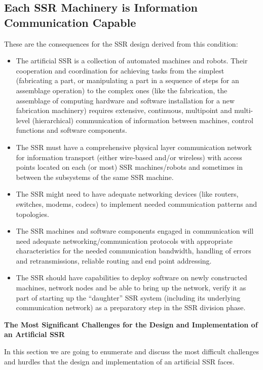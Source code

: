 \documentclass[letterpaper]{article}
\begin{document}
\subsection[Each SSR Machinery is Information Communication
Capable]{Each SSR Machinery is Information Communication Capable}
\hypertarget{RefHeading3134306210128}{}These are the consequences for
the SSR design derived from this condition:


\bigskip

\begin{itemize}
\item The artificial SSR is a collection of automated machines and
robots. Their cooperation and coordination for achieving tasks from the
simplest (fabricating a part, or manipulating a part in a sequence of
steps for an assemblage operation) to the complex ones (like the
fabrication, the assemblage of computing hardware and software
installation for a new fabrication machinery) requires extensive,
continuous, multipoint and multi-level (hierarchical) communication of
information between machines, control functions and software
components.
\item The SSR must have a comprehensive physical layer communication
network for information transport (either wire-based and/or wireless)
with access points located on each (or most) SSR machines/robots and
sometimes in between the subsystems of the same SSR machine.
\item The SSR might need to have adequate networking devices (like
routers, switches, modems, codecs) to implement needed communication
patterns and topologies.
\item The SSR machines and software components engaged in communication
will need adequate networking/communication protocols with appropriate
characteristics for the needed communication bandwidth, handling of
errors and retransmissions, reliable routing and end point addressing.
\item The SSR should have capabilities to deploy software on newly
constructed machines, network nodes and be able to bring up the
network, verify it as part of starting up the “daughter” SSR system
(including its underlying communication network) as a preparatory step
in the SSR division phase.
\end{itemize}
{\bfseries
\hypertarget{RefHeading3136306210128}{}The Most Significant Challenges
for the Design and Implementation of an Artificial SSR}

In this section we are going to enumerate and discuss the most difficult
challenges and hurdles that the design and implementation of an
artificial SSR faces.
\end{document}
